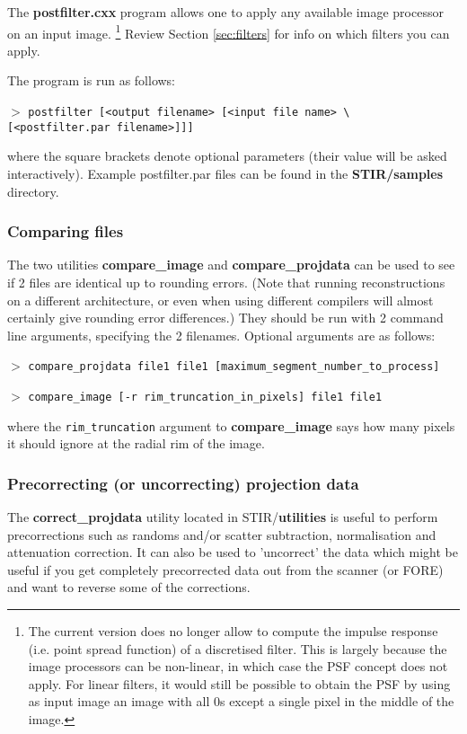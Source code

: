 \documentclass{article}
\newcommand{\cmdline}[1]{\par \noindent $>$ \texttt{#1}\par}
\begin{document}
The \textbf{postfilter.cxx} program allows one to apply any available 
image processor on an input image. \footnote{{\small The current version 
does no longer allow to compute the impulse response (i.e. point 
spread function) of a discretised filter. This is largely because 
the image processors can be non-linear, in which case the PSF 
concept does not apply. For linear filters, it would still be 
possible to obtain the PSF by using as input image an image with 
all 0s except a single pixel in the middle of the image.}} Review 
Section \ref{sec:filters} for info on which filters you can apply.


The program is run as follows:
\cmdline{postfilter [\texttt{<}output filename\texttt{>} [\texttt{<}input file 
name\texttt{>} {\textbackslash}\\
{[}\texttt{<}postfilter.par filename\texttt{>}]]]}


where the square brackets denote optional parameters (their value 
will be asked interactively). Example postfilter.par files can 
be found in the \textbf{STIR/samples} directory.


\subsubsection{
Comparing files}

The two utilities \textbf{compare\_image} and \textbf{compare\_projdata} 
can be used to see if 2 files are identical up to rounding errors. 
(Note that running reconstructions on a different architecture, 
or even when using different compilers will almost certainly 
give rounding error differences.) They should be run with 2 command 
line arguments, specifying the 2 filenames. Optional arguments 
are as follows:
\cmdline{compare\_projdata file1 file1 
[maximum\_segment\_number\_to\_process]}
\cmdline{compare\_image [-r rim\_truncation\_in\_pixels] file1 file1}


where the \texttt{rim\_truncation} argument to \textbf{compare\_image}  says 
how many pixels it should ignore at the radial rim of the image.



\subsubsection{
Precorrecting (or uncorrecting) projection data}

The \textbf{correct\_projdata} utility located in STIR/\textbf{utilities} 
is useful to perform precorrections such as randoms and/or scatter 
subtraction, normalisation and attenuation correction. It can 
also be used to 'uncorrect' the data which might be useful if 
you get completely precorrected data out from the scanner (or 
FORE) and want to reverse some of the corrections.
\end{document}
